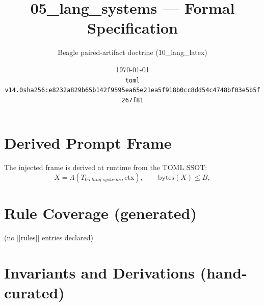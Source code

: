 \documentclass[11pt]{article}
\title{05\_lang\_systems --- Formal Specification}
\author{Beagle paired-artifact doctrine (10\_lang\_latex)}
\date{\today\\ \texttt{toml v14.0\quad sha256:e8232a829b65b142f9595ea65e21ea5f918b0cc8dd54c4748bf03e5b5f267f81}}
\begin{document}
\maketitle

\section{Derived Prompt Frame}
The injected frame is derived at runtime from the TOML SSOT:
\begin{equation}
  X = \Lambda(T_{05\_lang\_systems}, \mathrm{ctx}), \qquad \mathrm{bytes}(X) \le B,
  \label{lbl:derive-frame}
\end{equation}

\section{Rule Coverage (generated)}
(no [[rules]] entries declared)

\section{Invariants and Derivations (hand-curated)}
\end{document}
